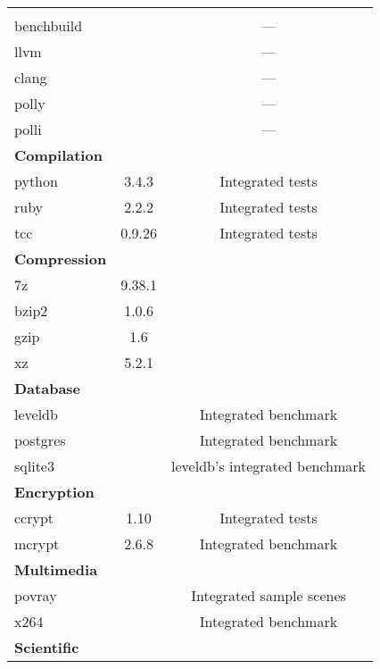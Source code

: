 \begin{table}[H]
    \myfloatalign
    \begin{tabularx}{\textwidth}{lcC} \toprule
         &  & \\
        \midrule
        \\
        benchbuild &  & ---\\
        llvm &  & ---\\
        clang &  & ---\\
        polly &  & ---\\
        polli &  & ---\\
        \midrule
        \textbf{Compilation}\\
        python & 3.4.3 & Integrated tests\\
        ruby & 2.2.2 & Integrated tests\\
        tcc & 0.9.26 & Integrated tests\\
        \midrule
        \textbf{Compression}\\
        7z & 9.38.1 & \\
        bzip2 & 1.0.6 & \\
        gzip & 1.6 & \\
        xz & 5.2.1 & \\
        \midrule
        \textbf{Database}\\
        leveldb &  & Integrated benchmark\\
        postgres & & Integrated benchmark\\
        sqlite3 &  & leveldb's integrated benchmark\\
        \midrule
        \textbf{Encryption}\\
        ccrypt & 1.10 & Integrated tests\\
        mcrypt & 2.6.8 & Integrated benchmark\\
        \midrule
        \textbf{Multimedia}\\
        povray &  & Integrated sample scenes\\
        x264 &  & Integrated benchmark\\
        \midrule
        \textbf{Scientific}\\

\end{tabularx}
\end{table}

